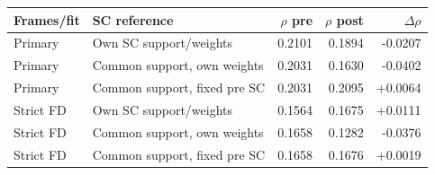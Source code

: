 \begin{tabular}{llrrr}
\toprule
Frames/fit & SC reference & $\rho$ pre & $\rho$ post & $\Delta\rho$ \\
\midrule
Primary & Own SC support/weights & 0.2101 & 0.1894 & -0.0207 \\
Primary & Common support, own weights & 0.2031 & 0.1630 & -0.0402 \\
Primary & Common support, fixed pre SC & 0.2031 & 0.2095 & +0.0064 \\
Strict FD & Own SC support/weights & 0.1564 & 0.1675 & +0.0111 \\
Strict FD & Common support, own weights & 0.1658 & 0.1282 & -0.0376 \\
Strict FD & Common support, fixed pre SC & 0.1658 & 0.1676 & +0.0019 \\
\bottomrule
\end{tabular}
